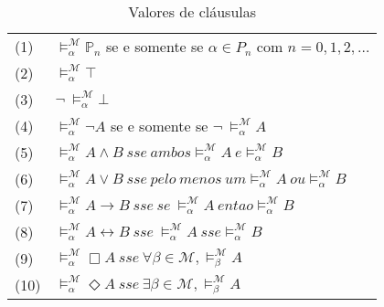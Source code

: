 \begin{center}
    \begin{table}[h!]
\label{table:truth3}
\caption{Valores de cláusulas}

    \begin{tabular}{ll}

        \vspace{2mm}
        (1) & $\models ^{\mathcal{M}}_{\alpha} \mathbb{P}_n$ se e somente se $\alpha \in
        P_n$ com $n=0,1,2,\ldots$\\
        \vspace{2mm}
        (2)  & $\models ^{\mathcal{M}}_{\alpha} \top$\\
        \vspace{2mm}
        (3)  & $\neg\ \models ^{\mathcal{M}}_{\alpha}\bot $\\
        \vspace{2mm}
        (4)  & $\models ^{\mathcal{M}}_{\alpha} \neg A$ se e somente se $\neg \
        \models ^{\mathcal{M}}_{\alpha} A$\\
        \vspace{2mm}
        (5)  & $\models ^{\mathcal{M}}_{\alpha} A \wedge B\ sse\ ambos
        \models ^{\mathcal{M}}_{\alpha} A\ e \models ^{\mathcal{M}}_{\alpha} B$ \\
        \vspace{2mm}
        (6)  & $\models ^{\mathcal{M}}_{\alpha} A \vee B\ sse\ pelo\ menos\ um
        \models ^{\mathcal{M}}_{\alpha} A\ ou \models ^{\mathcal{M}}_{\alpha} B$ \\
        \vspace{2mm}
        (7)  & $\models ^{\mathcal{M}}_{\alpha} A \rightarrow B\ sse\ se\
    \models ^{\mathcal{M}}_{\alpha} A\ entao \models ^{\mathcal{M}}_{\alpha} B$ \\
        \vspace{2mm}
        (8)  & $\models ^{\mathcal{M}}_{\alpha} A \leftrightarrow B\ sse\ 
        \models ^{\mathcal{M}}_{\alpha} A\ sse \models ^{\mathcal{M}}_{\alpha} B$ \\
        \vspace{2mm}
        (9)  & $\models ^{\mathcal{M}}_{\alpha} \Box A\ sse\ \forall \beta \in
        \mathcal{M}, \models ^{\mathcal{M}}_{\beta} A$\\
        \vspace{2mm}
        (10)  & $\models ^{\mathcal{M}}_{\alpha} \Diamond A\ sse\ \exists \beta \in
        \mathcal{M}, \models ^{\mathcal{M}}_{\beta} A$\\

    \end{tabular}
\end{table}
\end{center}

